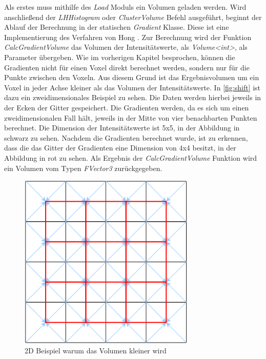 Als erstes muss mithilfe des \textit{Load} Moduls ein Volumen geladen werden. Wird anschließend der  \textit{LHHistogram} oder \textit{ClusterVolume} Befehl ausgeführt, beginnt der Ablauf der Berechnung in der statischen \textit{Gradient} Klasse.
\newline
Diese ist eine Implementierung des Verfahren von Hong \cite{hong2003method}. Zur Berechnung wird der Funktion \textit{CalcGradientVolume} das Volumen der Intensitätswerte, als \textit{Volume<int>}, als Parameter übergeben. Wie im vorherigen Kapitel besprochen, können die Gradienten nicht für einen Voxel direkt berechnet werden, sondern nur für die Punkte zwischen den Voxeln. Aus diesem Grund ist das Ergebnisvolumen um ein Voxel in jeder Achse kleiner als das Volumen der Intensitätswerte.
\newline
In \autoref{fig:shift} ist dazu ein zweidimensionales Beispiel zu sehen. Die Daten werden hierbei jeweils in der Ecken der Gitter gespeichert. Die Gradienten werden, da es sich um einen zweidimensionalen Fall hält, jeweils in der Mitte von vier benachbarten Punkten berechnet.
\newline
Die Dimension der Intensitätswerte ist 5x5, in der Abbildung in schwarz zu sehen. Nachdem die Gradienten berechnet wurde, ist zu erkennen, dass die das Gitter der Gradienten eine Dimension von 4x4 besitzt, in der Abbildung in rot zu sehen.
\newline
Als Ergebnis der \textit{CalcGradientVolume} Funktion wird ein Volumen vom Typen \textit{FVector3} zurückgegeben.


\begin{figure}
\centering 
\includegraphics[width=0.75\textwidth]{Logos/VoxelShift.png}
\caption{2D Beispiel warum das Volumen kleiner wird} 
\label{fig:shift} 
\end{figure}



